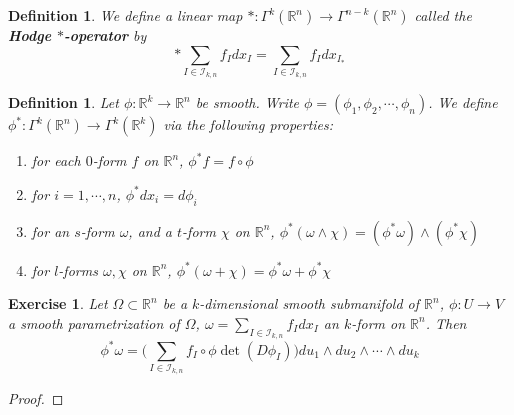 \documentclass[12pt]{amsart}
\newtheorem{defn}[thm]{Definition}
\newtheorem{ex}[thm]{Exercise}
\newcommand{\om}{\omega}
\newcommand{\Om}{\Omega}
\newcommand{\R}{\mathbb{R}}
\newcommand{\MI}{\mathcal{I}}
\begin{document}
	\begin{defn}
		We define a linear map $*:\Gamma^k(\R^n) \rightarrow \Gamma^{n-k}(\R^n)$ called the \textbf{Hodge $*$-operator} by $$* \sum\limits_{I \in \MI_{k,n}} f_I dx_I = \sum\limits_{I \in \MI_{k,n}} f_Idx_{I_*}$$
	\end{defn}

	\begin{defn}
		Let $\phi: \R^k \rightarrow \R^n$ be smooth. Write $\phi = (\phi_1, \phi_2, \cdots, \phi_n)$. We define $\phi^*:\Gamma^k(\R^n) \rightarrow \Gamma^k(\R^k)$ via the following properties: 
		\begin{enumerate}
			\item for each $0$-form $f$ on $\R^n$, $\phi^*f = f \circ \phi$
			\item  for $i = 1, \cdots , n$, $\phi^* dx_i = d\phi_i$ 
			\item for an $s$-form $\om$, and a $t$-form $\chi$ on $\R^n$,  $\phi^* (\om \wedge \chi) = (\phi^*\om) \wedge (\phi^*\chi)$
			\item for $l$-forms $\om, \chi$ on $\R^n$, $\phi^*(\om + \chi) = \phi^*\om + \phi^*\chi$ 
		\end{enumerate}
	\end{defn}

	\begin{ex}
			Let $\Om \subset \R^n$ be a $k$-dimensional smooth submanifold of $\R^n$, $\phi: U \rightarrow V$ a smooth parametrization of $\Om$, $\om = \sum_{I \in \MI_{k,n}} f_Idx_I$  an $k$-form on $\R^n$. Then $$\phi^* \om = \bigg( \sum_{I \in \MI_{k, n}} f_I \circ \phi \det(D\phi_I)\bigg)du_1 \wedge du_2 \wedge \cdots \wedge du_k$$ 
	\end{ex}

	\begin{proof}
		
	\end{proof}
	
\end{document}
